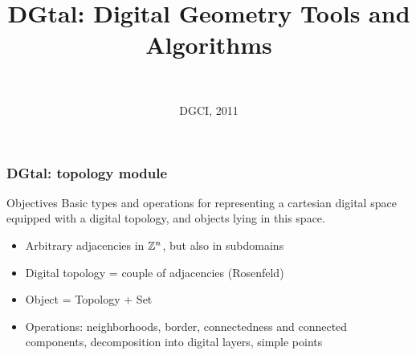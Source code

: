 \documentclass[pdftex,francais]{beamer}
\title{DGtal:  Digital Geometry Tools and Algorithms}
\author[ ]{  \\[3mm]
  \small

  \normalsize
}
\date{DGCI, 2011}
\begin{document}
\newlength{\unquart}
\setlength{\unquart}{0.21\textwidth}

\begin{frame}
  \titlepage
\end{frame}

\begin{frame}
  \frametitle{DGtal: topology module}
  
  \begin{block}{Objectives}
    Basic types and operations for representing a cartesian digital
    space equipped with a digital topology, and objects lying in this
    space.
  \end{block}

  \begin{itemize}
  \item Arbitrary adjacencies in $\mathbb{Z}^n$, but also in subdomains
  \item Digital topology = couple of adjacencies (Rosenfeld)
  \item Object = Topology + Set
  \item Operations: neighborhoods, border, connectedness and connected
    components, decomposition into digital layers, simple points
  \end{itemize}

\end{frame}


\end{document}
